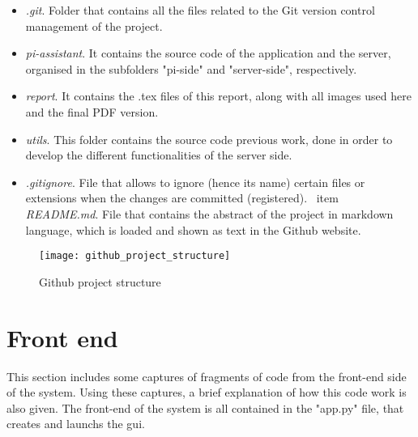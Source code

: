 	\begin{itemize}
		\item \textit{.git}. Folder that contains all the files related to the Git version control management of the project.
		\item \textit{pi-assistant}. It contains the source code of the application and the server, organised in the subfolders "pi-side" and "server-side", respectively.
		\item \textit{report}. It contains the .tex files of this report, along with all images used here and the final PDF version.
		\item \textit{utils}. This folder contains the source code previous work, done in order to develop the different functionalities of the server side. 
		\item \textit{.gitignore}. File that allows to ignore (hence its name) certain files or extensions when the changes are committed (registered).
		\ item \textit{README.md}. File that contains the abstract of the project in markdown language, which is loaded and shown as text in the Github website. 
	\end{itemize}

	\begin{figure}[!ht]
		\centering
		\vspace{-0.1cm}
		\texttt{[image: github\_project\_structure]}
		\caption{Github project structure}
		\label{fig:github_project_structure}
	\end{figure}



\section{Front end}
\label{sec:front_end}
This section includes some captures of fragments of code from the front-end side of the system. Using these captures, a brief explanation of how this code work is also given. The front-end of the system is all contained in the "app.py" file, that creates and launchs the \gls{gui}.

